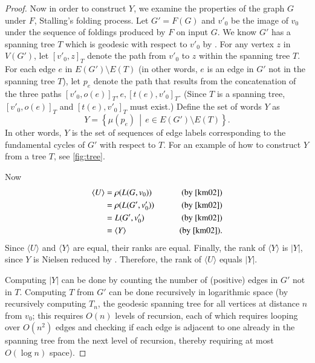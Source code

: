 \documentclass{elsarticlenonatbib}
\newcommand{\gen}[1]{\langle #1 \rangle}
\begin{document}
\begin{proof}
  Now in order to construct $Y$, we examine the properties of the graph $G$ under $F$, Stalling's folding process.
  Let $G' = F(G)$ and $v'_0$ be the image of $v_0$ under the sequence of foldings produced by $F$ on input $G$.
  We know $G'$ has a spanning tree $T$ which is geodesic with respect to $v'_0$ by \cite[Lemma~6.6]{km02}.
  For any vertex $z$ in $V(G')$, let $[v'_0, z]_T$ denote the path from $v'_0$ to $z$ within the spanning tree $T$.
  For each edge $e$ in $E(G') \setminus E(T)$ (in other words, $e$ is an edge in $G'$ not in the spanning tree $T$), let $p_e$ denote the path that results from the concatenation of the three paths $[v'_0, o(e)]_T, e, [t(e), v'_0]_T$.
  (Since $T$ is a spanning tree, $[v'_0, o(e)]_T$ and $[t(e), v'_0]_T$ must exist.)
  Define the set of words $Y$ as
  \begin{equation*}
    Y = \left\{\mu(p_e) \, \middle| \, e \in E(G') \setminus E(T) \right\}.
  \end{equation*}
  In other words, $Y$ is the set of sequences of edge labels corresponding to the fundamental cycles of $G'$ with respect to $T$.
  For an example of how to construct $Y$ from a tree $T$, see \autoref{fig:tree}.
  
  Now
  \begin{align*}
    \gen{U} & = \rho(L(G, v_0)) & \qquad \text{(by \cite[Proposition~3.8]{km02})} \\
            & = \rho(L(G', v'_0)) & \qquad \text{(by \cite[Lemma~3.4]{km02})} \\
            & = L(G', v'_0) & \qquad \text{(by \cite[Lemma~2.9]{km02})} \\
            & = \gen{Y} & \qquad \text{(by \cite[Lemma~6.1]{km02})}.
  \end{align*}
  Since $\gen{U}$ and $\gen{Y}$ are equal, their ranks are equal.
  Finally, the rank of $\gen{Y}$ is $|Y|$, since $Y$ is Nielsen reduced by \cite[Proposition~6.7]{km02}.
  Therefore, the rank of $\gen{U}$ equals $|Y|$.

  Computing $|Y|$ can be done by counting the number of (positive) edges in $G'$ not in $T$.
  Computing $T$ from $G'$ can be done recursively in logarithmic space (by recursively computing $T_n$, the geodesic spanning tree for all vertices at distance $n$ from $v_0$; this requires $O(n)$ levels of recursion, each of which requires looping over $O(n^2)$ edges and checking if each edge is adjacent to one already in the spanning tree from the next level of recursion, thereby requiring at most $O(\log n)$ space).
\end{proof}
\end{document}
